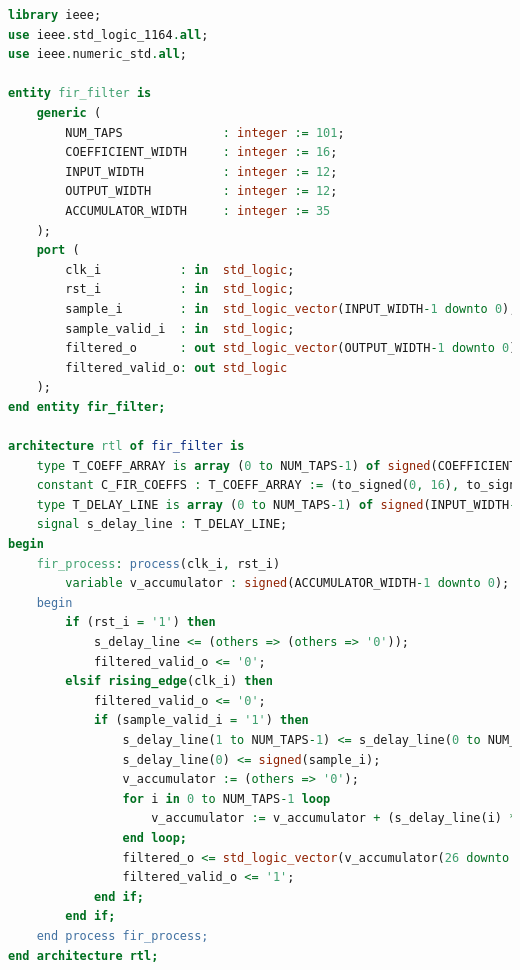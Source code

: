 \documentclass[a4paper,12pt]{article}
\begin{document}
\begin{lstlisting}[language=VHDL, basicstyle=\tiny, lineskip=0em,belowskip=0em,aboveskip=0em, frame=single]
library ieee;
use ieee.std_logic_1164.all;
use ieee.numeric_std.all;

entity fir_filter is
    generic (
        NUM_TAPS              : integer := 101;
        COEFFICIENT_WIDTH     : integer := 16;
        INPUT_WIDTH           : integer := 12;
        OUTPUT_WIDTH          : integer := 12;
        ACCUMULATOR_WIDTH     : integer := 35
    );
    port (
        clk_i           : in  std_logic;
        rst_i           : in  std_logic;
        sample_i        : in  std_logic_vector(INPUT_WIDTH-1 downto 0);
        sample_valid_i  : in  std_logic;
        filtered_o      : out std_logic_vector(OUTPUT_WIDTH-1 downto 0);
        filtered_valid_o: out std_logic
    );
end entity fir_filter;

architecture rtl of fir_filter is
    type T_COEFF_ARRAY is array (0 to NUM_TAPS-1) of signed(COEFFICIENT_WIDTH-1 downto 0);
    constant C_FIR_COEFFS : T_COEFF_ARRAY := (to_signed(0, 16), to_signed(-9, 16), ...);
    type T_DELAY_LINE is array (0 to NUM_TAPS-1) of signed(INPUT_WIDTH-1 downto 0);
    signal s_delay_line : T_DELAY_LINE;
begin
    fir_process: process(clk_i, rst_i)
        variable v_accumulator : signed(ACCUMULATOR_WIDTH-1 downto 0);
    begin
        if (rst_i = '1') then
            s_delay_line <= (others => (others => '0'));
            filtered_valid_o <= '0';
        elsif rising_edge(clk_i) then
            filtered_valid_o <= '0';
            if (sample_valid_i = '1') then
                s_delay_line(1 to NUM_TAPS-1) <= s_delay_line(0 to NUM_TAPS-2);
                s_delay_line(0) <= signed(sample_i);
                v_accumulator := (others => '0');
                for i in 0 to NUM_TAPS-1 loop
                    v_accumulator := v_accumulator + (s_delay_line(i) * C_FIR_COEFFS(i));
                end loop;
                filtered_o <= std_logic_vector(v_accumulator(26 downto 15));
                filtered_valid_o <= '1';
            end if;
        end if;
    end process fir_process;
end architecture rtl;
\end{lstlisting}
\vspace{-1.5em}
\begin{center}
\end{center}
\vspace{-1.5em}
\end{document}

